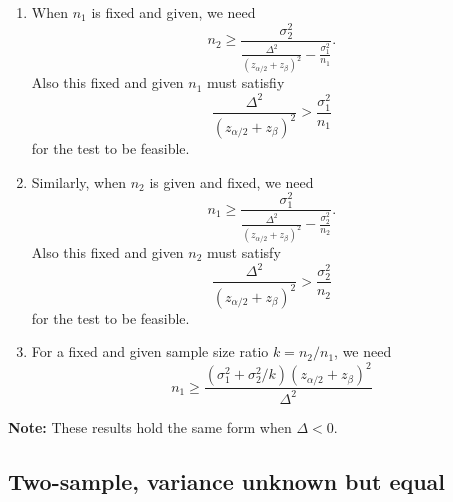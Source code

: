 \documentclass[a4paper,12pt]{article}
\begin{document}
\begin{enumerate}
\item When $n_1$ is fixed and given, we need
  \[
    n_2 \geq
    \frac{
      \sigma_2^2
    }{
      \frac{\Delta^2}{
        \left(
          z_{\alpha / 2} + z_{\beta}
        \right)^2
      }
      - \frac{\sigma_1^2}{n_1}
    }
    .
  \]
  Also this fixed and given $n_1$ must satisfiy
  \[
    \frac{\Delta^2}{
      \left(
        z_{\alpha / 2} + z_{\beta}
      \right)^2
    }
    >
    \frac{\sigma_1^2}{n_1}
  \]
  for the test to be feasible.
\item Similarly, when $n_2$ is given and fixed, we need
  \[
    n_1 \geq
    \frac{\sigma_1^2}{
      \frac{\Delta^2}{
        \left(
          z_{\alpha / 2} + z_{\beta}
        \right)^2
      }
      - \frac{\sigma_2^2}{n_2}
    }
    .
  \]
  Also this fixed and given $n_2$ must satisfy
  \[
    \frac{\Delta^2}{
      \left(
        z_{\alpha / 2} + z_{\beta}
      \right)^2
    }
    >
    \frac{\sigma_2^2}{n_2}
  \]
  for the test to be feasible.
\item For a fixed and given sample size ratio $k = n_2 / n_1$, we need
  \[
    n_1 \geq
    \frac{
      \left(\sigma_1^2 + \sigma_2^2 / k\right)
      \left(
        z_{\alpha / 2} + z_{\beta}
      \right)^2
    }{
      \Delta^2
    }
  \]
\end{enumerate}
\textbf{Note: } These results hold the same form when $\Delta < 0$.

\subsection{Two-sample, variance unknown but equal}
\label{sec:two-sample-variance-1}
\end{document}
